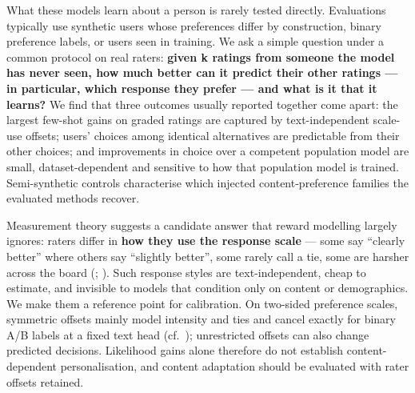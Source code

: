\documentclass{article}
\begin{document}
What these models learn about a person is rarely tested directly. Evaluations typically use synthetic users whose preferences differ by construction, binary preference labels, or users seen in training. We ask a simple question under a common protocol on real raters: \textbf{given k ratings from someone the model has never seen, how much better can it predict their other ratings --- in particular, which response they prefer --- and what is it that it learns?} We find that three outcomes usually reported together come apart: the largest few-shot gains on graded ratings are captured by text-independent scale-use offsets; users' choices among identical alternatives are predictable from their other choices; and improvements in choice over a competent population model are small, dataset-dependent and sensitive to how that population model is trained. Semi-synthetic controls characterise which injected content-preference families the evaluated methods recover.

Measurement theory suggests a candidate answer that reward modelling largely ignores: raters differ in \textbf{how they use the response scale} --- some say ``clearly better'' where others say ``slightly better'', some rarely call a tie, some are harsher across the board (\citealp{linacre1989mfrm}; \citealp{baumgartner2001response}). Such response styles are text-independent, cheap to estimate, and invisible to models that condition only on content or demographics. We make them a reference point for calibration. On two-sided preference scales, symmetric offsets mainly model intensity and ties and cancel exactly for binary A/B labels at a fixed text head (cf.~\citealp{raj2026pebs}); unrestricted offsets can also change predicted decisions. Likelihood gains alone therefore do not establish content-dependent personalisation, and content adaptation should be evaluated with rater offsets retained.
\end{document}
